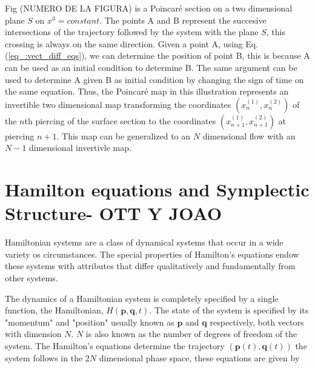 Fig (NUMERO DE LA FIGURA) is a Poincaré section on a two dimensional plane $S$ on $x^{3}=constant$. The points A and B represent the succesive intersections of the trajectory followed by the system with the plane $S$, this crossing is always on the same direction. Given a point A, using Eq. (\ref{eq_:vect_diff_eqs}), we can determine the position of point B, this is because A can be used as an initial condition to determine B. The same argument can be used to determine A given B as initial condition by changing the sign of time on the same equation. Thus, the Poincar\'e map in this illustration represents an invertible two dimensional map transforming the coordinates $(x_n^{(1)},x_n^{(2)})$ of the $n$th piercing of the surface section to the coordinates $(x_{n+1}^{(1)},x_{n+1}^{(2)})$ at piercing $n+1$. This map can be generalized to an $N$ dimensional flow with an $N-1$ dimensional invertivle map.

\section{Hamilton equations and Symplectic Structure- OTT Y JOAO}

Hamiltonian systems are a class of dynamical systems that occur in a wide variety os circumstances. The special properties of Hamilton's equations endow these systems with attributes that differ qualitatively and fundamentally from other systems.\par 

The dynamics of a Hamiltonian system is completely specified by a single function, the Hamiltonian, $H(\bm{p},\bm{q},t)$. The state of the system is specified by its "momentum" and "position" usually known as $\bm{p}$ and $\bm{q}$ respectively, both vectors with dimension $N$. $N$ is also known as the number of degrees of freedom of the system. The Hamilton's equations determine the trajectory $(\bm{p}(t),\bm{q}(t))$ the system follows in the $2N$ dimensional phase space, these equations are given by

